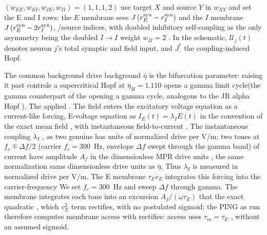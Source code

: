 \documentclass[11pt,a4paper]{article}
\providecommand{\DIFaddtex}[1]{{\protect\color{blue} \sf #1}} %
\providecommand{\DIFdeltex}[1]{{\protect\color{red} \scriptsize #1}} %
\providecommand{\DIFaddbegin}{} %
\providecommand{\DIFaddend}{} %
\providecommand{\DIFdelbegin}{} %
\providecommand{\DIFdelend}{} %
\providecommand{\DIFadd}[1]{\texorpdfstring{\DIFaddtex{#1}}{#1}} %
\providecommand{\DIFdel}[1]{\texorpdfstring{\DIFdeltex{#1}}{}} %
\begin{document}
$(w_{EE},w_{EI},w_{IE},w_{II})=(1,1,1,2)$ use target\DIFdelbegin \DIFdel{$X$ and source $Y$ in $w_{XY}$ and set the E and I rows: the $E$ membrane sees $J\,(r_E^{\rm syn}-r_I^{\rm syn})$ and the $I$ membrane
$J\,(r_E^{\rm syn}-2r_I^{\rm syn})$,
}\DIFdelend \DIFaddbegin \DIFadd{/source indices,
with doubled inhibitory self-coupling as }\DIFaddend the only asymmetry\DIFdelbegin \DIFdel{being the doubled $I\!\to\!I$ weight $w_{II}=2$}\DIFdelend \DIFaddbegin \DIFadd{.
In the schematic, $\mathcal U_j(t)$ denotes neuron $j$'s total synaptic
and field input, and $J^*$ the coupling-induced Hopf}\DIFaddend .

The \DIFdelbegin \DIFdel{common background drive }\DIFdelend \DIFaddbegin \DIFadd{background }\DIFaddend $\bar\eta$ \DIFdelbegin \DIFdel{is the bifurcation parameter: raising it
past }\DIFdelend \DIFaddbegin \DIFadd{controls }\DIFaddend a supercritical Hopf \DIFdelbegin \DIFdel{at $\bar\eta_H=1.110$ opens a gamma
limit cycle(the gamma
counterpart of the }\DIFdelend \DIFaddbegin \DIFadd{opening a gamma
cycle, analogous to the }\DIFaddend JR alpha Hopf\DIFdelbegin \DIFdel{). The applied }\DIFdelend \DIFaddbegin \DIFadd{. The }\DIFaddend field enters the \DIFdelbegin \DIFdel{excitatory voltage equation as a current-like forcing, }\DIFdelend \DIFaddbegin \DIFadd{E-voltage
equation as }\DIFaddend $I_E(t)=\lambda_I E(t)$ \DIFdelbegin \DIFdel{in the convention of the exact mean field
\cite{ruffini2021nmm2}, with instantaneous field-to-current }\DIFdelend \DIFaddbegin \DIFadd{\cite{ruffini2021nmm2}.
The instantaneous }\DIFaddend coupling $\lambda_I$ \DIFdelbegin \DIFdel{, as two genuine }\DIFdelend \DIFaddbegin \DIFadd{has units of normalized drive per V/m;
two }\DIFaddend tones at $f_c\mp\Delta f/2$ \DIFdelbegin \DIFdel{(carrier $f_c=300$~Hz, envelope $\Delta f$ swept through the gamma band)
of current }\DIFdelend \DIFaddbegin \DIFadd{have }\DIFaddend amplitude $A_f$ in the \DIFdelbegin \DIFdel{dimensionless MPR drive units , the same
normalization }\DIFdelend \DIFaddbegin \DIFadd{same
dimensionless drive units }\DIFaddend as $\bar\eta$. \DIFdelbegin \DIFdel{Thus $\lambda_I$ is measured in normalized drive per V/m. The E membrane $\tau_E\dot v_E$
integrates this forcing into the carrier-frequency }\DIFdelend \DIFaddbegin \DIFadd{We set $f_c=300$~Hz and sweep
$\Delta f$ through gamma. The membrane integrates each tone into an
}\DIFaddend excursion $A_f/(\omega\tau_E)$\DIFdelbegin \DIFdel{that the
exact quadratic }\DIFdelend \DIFaddbegin \DIFadd{, which }\DIFaddend $v_E^2$ \DIFdelbegin \DIFdel{term rectifies, with no postulated sigmoid; the PING as run
therefore computes membrane access with }\DIFdelend \DIFaddbegin \DIFadd{rectifies: access uses
}\DIFaddend $\tau_m=\tau_E$\DIFaddbegin \DIFadd{, without an assumed sigmoid}\DIFaddend .
\end{document}
